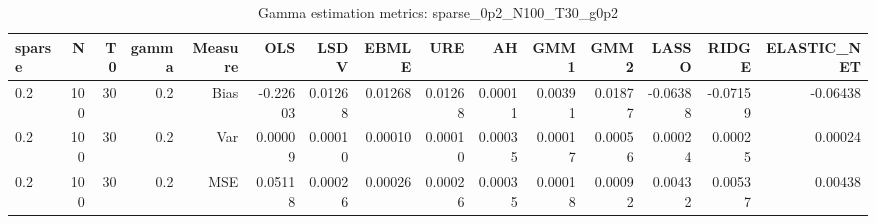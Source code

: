 \begin{table}[!htbp]\centering
\caption{Gamma estimation metrics: sparse_0p2_N100_T30_g0p2}
\label{tab:table1_sparse_0p2_N100_T30_g0p2}
\begin{tabular}{lrrrrrrrrrrrrrr}
\hline
sparse & N & T0 & gamma & Measure & OLS & LSDV & EBMLE & URE & AH & GMM1 & GMM2 & LASSO & RIDGE & ELASTIC_NET \\
\hline
0.2 & 100 & 30 & 0.2 & Bias & -0.22603 & 0.01268 & 0.01268 & 0.01268 & 0.00011 & 0.00391 & 0.01877 & -0.06388 & -0.07159 & -0.06438 \\
0.2 & 100 & 30 & 0.2 & Var & 0.00009 & 0.00010 & 0.00010 & 0.00010 & 0.00035 & 0.00017 & 0.00056 & 0.00024 & 0.00025 & 0.00024 \\
0.2 & 100 & 30 & 0.2 & MSE & 0.05118 & 0.00026 & 0.00026 & 0.00026 & 0.00035 & 0.00018 & 0.00092 & 0.00432 & 0.00537 & 0.00438 \\
\hline
\end{tabular}
\end{table}

